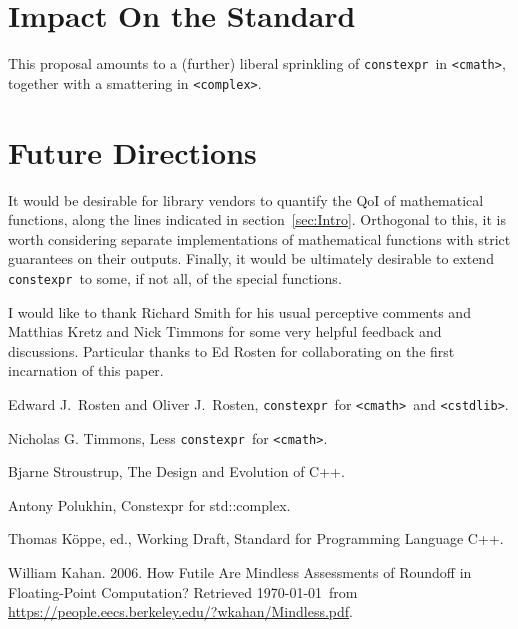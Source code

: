 \documentclass[prd,twocolumn,amsmath,amssymb,nofootinbib,eqsecnum]{revtex4-1}
\newcommand{\constexpr}{\code{constexpr}\xspace}
\newcommand{\code}[1]{{\tt #1}}
\newcommand{\header}[1]{{\tt <#1>}}
\newcommand{\cmath}{\header{cmath}}
\newcommand{\complex}{\header{complex}}
\newcommand{\cstdlib}{\header{cstdlib}}
\newcommand{\sect}[1]{section~\ref{sec:#1}}
\begin{document}
\section{Impact On the Standard}

This proposal amounts to a (further) liberal sprinkling of \constexpr\ in \cmath, together with a smattering in \complex.

\section{Future Directions}

It would be desirable for library vendors to quantify the QoI of mathematical functions, along the lines indicated in \sect{Intro}. Orthogonal to this, it is worth considering separate implementations of mathematical functions with strict guarantees on their outputs. Finally, it would be ultimately desirable to extend \constexpr\ to some, if not all, of the special functions. 


\begin{acknowledgments}
	I would like to thank Richard Smith for his usual perceptive comments and Matthias Kretz and 	Nick Timmons for some very helpful feedback and discussions. Particular thanks to Ed Rosten for collaborating on the first incarnation of this paper.
\end{acknowledgments}


\begin{thebibliography}{1}
	 Edward J.~Rosten and Oliver J.~Rosten, \constexpr\ for \cmath\ and \cstdlib.

	 Nicholas G. Timmons, Less \constexpr\ for \cmath.
	
	 Bjarne Stroustrup, The Design and Evolution of C++.

	 Antony Polukhin, Constexpr for std::complex.	
		
	 Thomas K\"oppe, ed., Working Draft, Standard for Programming Language C++.	
	
	 William Kahan. 2006. How Futile Are Mindless Assessments of Roundoff in Floating-Point Computation? Retrieved \today\ from \url{https://people.eecs.berkeley.edu/?wkahan/Mindless.pdf}.
	
\end{thebibliography}
\end{document}
